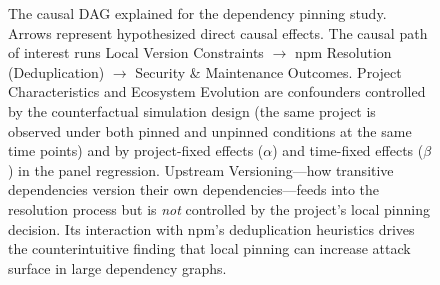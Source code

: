 \begin{figure}[t]
\centering
{}
\caption{The causal DAG explained for the dependency pinning study.
Arrows represent hypothesized direct causal effects.
The causal path of interest runs Local Version Constraints $\to$ npm Resolution (Deduplication) $\to$ Security \& Maintenance Outcomes.
Project Characteristics and Ecosystem Evolution are confounders controlled by the counterfactual simulation design (the same project is observed under both pinned and unpinned conditions at the same time points) and by project-fixed effects ($\alpha$) and time-fixed effects ($\beta$) in the panel regression.
Upstream Versioning---how transitive dependencies version their own dependencies---feeds into the resolution process but is \emph{not} controlled by the project's local pinning decision.
Its interaction with npm's deduplication heuristics drives the counterintuitive finding that local pinning can increase attack surface in large dependency graphs.}
\label{fig:pinning-dag}
\end{figure}


